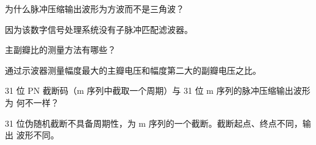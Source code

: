 \documentclass[../main]{subfiles}
\begin{document}
\begin{Exercise}
  为什么脉冲压缩输出波形为方波而不是三角波？
\end{Exercise}

\begin{Answer}
  因为该数字信号处理系统没有子脉冲匹配滤波器。
\end{Answer}

\begin{Exercise}
  主副瓣比的测量方法有哪些？
\end{Exercise}

\begin{Answer}
  通过示波器测量幅度最大的主瓣电压和幅度第二大的副瓣电压之比。
\end{Answer}

\begin{Exercise}
  31 位 PN 截断码（m 序列中截取一个周期）与 31 位 m 序列的脉冲压缩输出波形为
  何不一样？
\end{Exercise}

\begin{Answer}
  31 位伪随机截断不具备周期性，为 m 序列的一个截断。截断起点、终点不同，输出
     波形不同。
\end{Answer}
\end{document}
